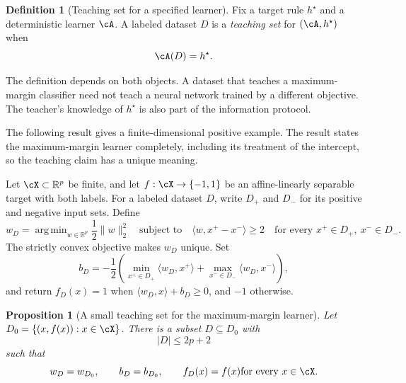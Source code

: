 \documentclass[11pt,twoside]{article}
\newcommand{\R}{\mathbb R}
\DeclareMathOperator*{\argmin}{arg\,min}
\newtheorem{proposition}[theorem]{Proposition}
\theoremstyle{definition}
\newtheorem{definition}[theorem]{Definition}
\theoremstyle{remark}
\begin{document}
\begin{definition}[Teaching set for a specified learner]
Fix a target rule \(h^\star\) and a deterministic learner \(\cA\). A labeled
dataset \(D\) is a \emph{teaching set} for \((\cA,h^\star)\) when
\begin{equation}
 \cA(D)=h^\star.
 \label{eq:teaching-set}
\end{equation}
\end{definition}

The definition depends on both objects. A dataset that teaches a
maximum-margin classifier need not teach a neural network trained by a
different objective. The teacher's knowledge of \(h^\star\) is also part of
the information protocol.

The following result gives a finite-dimensional positive example. The result
states the maximum-margin learner completely, including its treatment of the
intercept, so the teaching claim has a unique meaning.

Let \(\cX\subset\R^p\) be finite, and let
\(f:\cX\to\{-1,1\}\) be an affine-linearly separable target with both labels.
For a labeled dataset \(D\), write \(D_+\) and \(D_-\) for its positive and
negative input sets. Define
\begin{equation}
 w_D=\argmin_{w\in\R^p}\frac12\lVert w\rVert_2^2
 \quad\text{subject to}\quad
 \langle w,x^+-x^-\rangle\ge2
 \quad\text{for every }x^+\in D_+,\ x^-\in D_-.
 \label{eq:pairwise-margin}
\end{equation}
The strictly convex objective makes \(w_D\) unique. Set
\begin{equation}
 b_D=-\frac12\left(
     \min_{x^+\in D_+}\langle w_D,x^+\rangle
    +\max_{x^-\in D_-}\langle w_D,x^-\rangle
   \right),
 \label{eq:margin-intercept}
\end{equation}
and return \(f_D(x)=1\) when
\(\langle w_D,x\rangle+b_D\ge0\), and \(-1\) otherwise.

\begin{proposition}[A small teaching set for the maximum-margin learner]
\label{prop:max-margin-teaching}
Let \(D_0=\{(x,f(x)):x\in\cX\}\). There is a subset
\(D\subseteq D_0\) with
\begin{equation}
 |D|\le2p+2
 \label{eq:teaching-size}
\end{equation}
such that
\begin{equation}
 w_D=w_{D_0},\qquad b_D=b_{D_0},\qquad
 f_D(x)=f(x)\quad\text{for every }x\in\cX.
 \label{eq:teaching-conclusion}
\end{equation}
\end{proposition}
\end{document}
